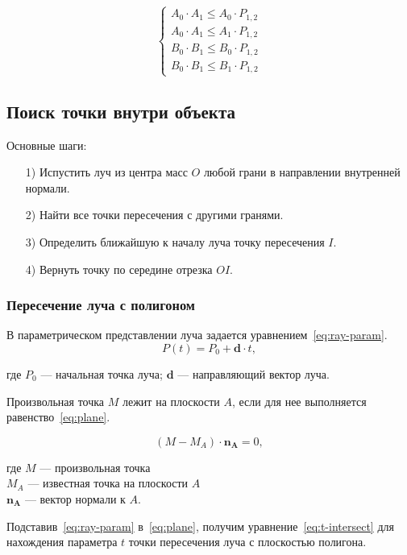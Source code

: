 \begin{equation}
    \begin{cases}
        A_0 \cdot A_1 \le A_0 \cdot P_{1,2}\\
        A_0 \cdot A_1 \le A_1 \cdot P_{1,2}\\
        B_0 \cdot B_1 \le B_0 \cdot P_{1,2}\\
        B_0 \cdot B_1 \le B_1 \cdot P_{1,2}
    \end{cases}
\end{equation}

\subsection{Поиск точки внутри объекта}
Основные шаги:
\begin{enumerate}
    \item[1)] Испустить луч из центра масс $O$ любой грани в направлении внутренней нормали.
    \item[2)] Найти все точки пересечения с другими гранями.
    \item[3)] Определить ближайшую к началу луча точку пересечения $I$.
    \item[4)] Вернуть точку по середине отрезка $OI$.
\end{enumerate}

\subsubsection{Пересечение луча с полигоном}
В параметрическом представлении луча задается уравнением~\eqref{eq:ray-param}.
\begin{equation}
    \label{eq:ray-param}
    P(t) = P_0 + \mathbf{d} \cdot t,
\end{equation}

где $P_0$ --- начальная точка луча; $\mathbf{d}$ --- направляющий вектор луча.

Произвольная точка $M$ лежит на плоскости $A$, если для нее выполняется равенство~\eqref{eq:plane}.

\begin{equation}
    \label{eq:plane}
    (M - M_A) \cdot \mathbf{n_A} = 0,
\end{equation}

где $M$ --- произвольная точка \\
$M_A$ --- известная точка на плоскости $A$\\
$\mathbf{n_A}$ --- вектор нормали к $A$.

Подставив~\eqref{eq:ray-param} в~\eqref{eq:plane}, получим уравнение~\eqref{eq:t-intersect} для нахождения параметра $t$ точки пересечения луча с плоскостью полигона.

